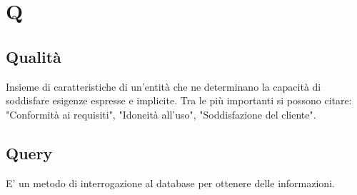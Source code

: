 \section*{Q}

\subsection{Qualità}
Insieme di caratteristiche di un'entità che ne determinano la capacità di soddisfare esigenze espresse e implicite. Tra le più importanti si possono citare: "Conformità ai requisiti", "Idoneità all'uso", "Soddisfazione del cliente".

\subsection{Query}
E' un metodo di interrogazione al database per ottenere delle informazioni.